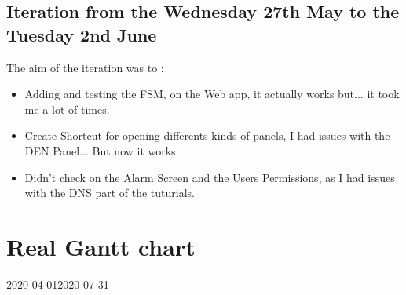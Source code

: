 \documentclass[a4paper, 10pt]{article}
\begin{document}
\subsection{Iteration from the Wednesday 27th May to the Tuesday 2nd June}
The aim of the iteration was to :
\begin{itemize}
    \item Adding and testing the FSM, on the Web app, it actually works but... it took me a lot of times.
    \item Create Shortcut for opening differents kinds of panels, I had issues with the DEN Panel... But now it works
    \item Didn't check on the Alarm Screen and the Users Permissions, as I had issues with the DNS part of the tuturials.
\end{itemize}

\newpage
\enlargeth
\section{Real Gantt chart}

\begin{ganttchart}[
    expand chart=\textwidth,
	time slot unit=day,
	time slot format=isodate
	]{2020-04-01}{2020-07-31}
	 \\
\end{ganttchart}
\end{document}

